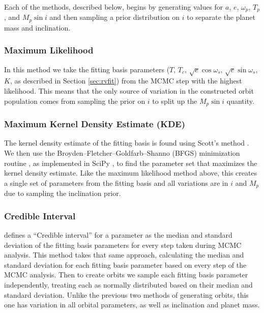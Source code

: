 Each of the methods, described below, begins by generating values for $a$, $e$, $\omega_p$, $T_p$, and $M_p \sin
i$ and then sampling a prior distribution on $i$ to separate the planet mass and inclination.
\subsubsection{Maximum Likelihood}
In this method we take the fitting basis parameters ($T$, $T_c$, $\sqrt{e} \cos{\omega_s}$, $\sqrt{e}
\sin{\omega_s}$, $K$, as described in Section \ref{sec:rvfit}) from the MCMC step with the highest likelihood.
This means that the only source of variation in the constructed orbit population comes from sampling
the prior on $i$ to split up the $M_p \sin i$ quantity.

\subsubsection{Maximum Kernel Density Estimate (KDE)}
The kernel density estimate of the fitting basis is found using Scott's method \citep{Scott1992}.
We then use the Broyden–Fletcher–Goldfarb–Shanno (BFGS) minimization routine
\citep{Nocedal2006}, as implemented in SciPy
\citep{virtanenSciPyFundamental2020}, to find the parameter set that maximizes the kernel density
estimate. Like the maximum likelihood method above, this creates a single set of parameters from the
fitting basis and all variations are in $i$ and $M_p$ due to sampling the inclination prior.

\subsubsection{Credible Interval}
 defines a ``Credible interval'' for a parameter as the median and standard deviation of the
fitting basis parameters for every step taken during MCMC analysis. 
This method takes that same approach, calculating the median and standard deviation for each
fitting basis parameter based on every step of the MCMC analysis.
Then to create orbits we sample each fitting basis parameter independently, treating each as normally distributed based on their median and standard deviation. Unlike the previous two methods of
generating orbits, this one has variation in all orbital parameters, as well as inclination and planet mass.

